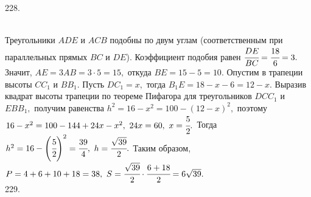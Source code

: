 \documentclass[12pt]{article}
\begin{document}
228. \begin{figure}[ht!]
\end{figure}\\
Треугольники $ADE$ и $ACB$ подобны по двум углам (соответственным при параллельных прямых $BC$ и $DE$). Коэффициент подобия равен $\cfrac{DE}{BC}=\cfrac{18}{6}=3.$ Значит, $AE=3AB=3\cdot5=15,$ откуда $BE=15-5=10.$ Опустим в трапеции высоты $CC_1$ и $BB_1.$ Пусть $DC_1=x,$ тогда $B_1E=18-x-6=12-x.$ Выразив квадрат высоты трапеции по теореме Пифагора для треугольников $DCC_1$ и $EBB_1,$ получим равенства $h^2=16-x^2=100-(12-x)^2,$ поэтому $16-x^2=100-144+24x-x^2,\ 24x=60,\ x=\cfrac{5}{2}.$ Тогда $h^2=16-\left(\cfrac{5}{2}\right)^2=\cfrac{39}{4},\ h=\cfrac{\sqrt{39}}{2}.$ Таким образом, $P=4+6+10+18=38,\ S=\cfrac{\sqrt{39}}{2}\cdot\cfrac{6+18}{2}=6\sqrt{39}.$\\
229. \begin{figure}[ht!]
\end{figure}\\
\end{document}
